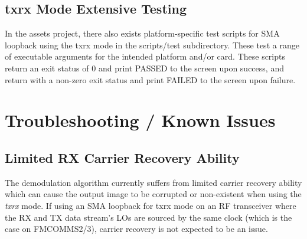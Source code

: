 
  \subsection{txrx Mode Extensive Testing}
    In the assets project, there also exists platform-specific test scripts for
    SMA loopback using the txrx mode in
    the scripts/test subdirectory. These test a range of executable arguments
    for the intended platform and/or card. These scripts return an exit
    status of 0 and print PASSED to the screen upon success, and return
    with a non-zero exit status and print FAILED to the screen upon failure.

\pagebreak

\section{Troubleshooting / Known Issues}

  \subsection{Limited RX Carrier Recovery Ability} %

    The demodulation algorithm currently suffers from limited carrier
    recovery ability which can cause the output image to be corrupted or
    non-existent
    when using the \textit{txrx} mode.
    If using an SMA loopback for txrx mode
    on an RF transceiver where the RX and TX data stream's LOs are sourced by
    the same clock (which is the case on FMCOMMS2/3), carrier recovery is not
    expected to be an issue.

